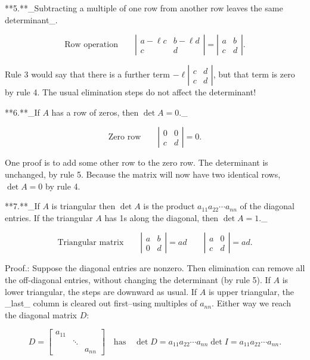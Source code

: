 

**5.**_Subtracting a multiple of one row from another row leaves the same determinant_.

\[\text{{Row operation}}\qquad\left|\begin{matrix}a-\ell c&b-\ell d\\ c&d\end{matrix}\right|=\left|\begin{matrix}a&b\\ c&d\end{matrix}\right|.\]

Rule 3 would say that there is a further term \(-\ell\left|\begin{matrix}c&d\\ c&d\end{matrix}\right|\), but that term is zero by rule 4. The usual elimination steps do not affect the determinant!

**6.**_If \(A\) has a row of zeros, then \(\det A=0\)._

\[\text{{Zero row}}\qquad\left|\begin{matrix}0&0\\ c&d\end{matrix}\right|=0.\]

One proof is to add some other row to the zero row. The determinant is unchanged, by rule 5. Because the matrix will now have two identical rows, \(\det A=0\) by rule 4.

**7.**_If \(A\) is triangular then \(\det A\) is the product \(a_{11}a_{22}\cdots a_{nn}\) of the diagonal entries. If the triangular \(A\) has 1s along the diagonal, then \(\det A=1\)._

\[\text{{Triangular matrix}}\qquad\left|\begin{matrix}a&b\\ 0&d\end{matrix}\right|=ad\qquad\left|\begin{matrix}a&0\\ c&d\end{matrix}\right|=ad.\]

Proof.: Suppose the diagonal entries are nonzero. Then elimination can remove all the off-diagonal entries, without changing the determinant (by rule 5). If \(A\) is lower triangular, the steps are downward as usual. If \(A\) is upper triangular, the _last_ column is cleared out first--using multiples of \(a_{nn}\). Either way we reach the diagonal matrix \(D\):

\[D=\left[\begin{matrix}a_{11}&&\\ &\ddots&\\ &&a_{nn}\end{matrix}\right]\quad\text{has}\quad\det D=a_{11}a_{22}\cdots a_{ nn}\det I=a_{11}a_{22}\cdots a_{nn}.\]

